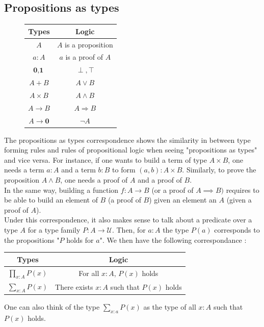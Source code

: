 \documentclass{report}
\begin{document}
\subsection{Propositions as types}
\begin{figure}[h]
\begin{center}
\begin{tabular}{|c|c|}
\hline Types & Logic  \\
\hline$A$ & $A$ is a proposition  \\
\hline$a: A$ & $a$ is a proof of $A$ \\
\hline $\textbf{0},\textbf{1}$ & $\perp, \top$ \\
\hline$A+B$ & $A \vee B$  \\
\hline$A \times B$ & $A \wedge B$  \\
\hline$A \rightarrow B$ & $A \Rightarrow B$ \\
\hline$A \rightarrow \textbf{0}$ & $\lnot A$ \\
\hline
\end{tabular}
\end{center}
\end{figure}
The propositions as types correspondence shows the similarity in between type forming rules and rules of propositional logic when seeing "propositions as types" and vice versa. For instance, if one wants to build a term of type $A \times B$, one needs a term $a : A$ and a term $b : B$ to form $(a,b) : A \times B$. Similarly, to prove the proposition $A \land B$, one needs a proof of $A$ and a proof of $B$. \\
In the same way, building a function $f : A \rightarrow B$ (or a proof of $A \implies B)$ requires to be able to build an element of $B$ (a proof of $B$) given an element an $A$ (given a proof of $A$).\\
Under this correspondence, it also makes sense to talk about a predicate over a type $A$ for a type family $P : A \rightarrow \mathcal{U}$. Then, for $a :A$ the type $P(a)$ corresponds to the propositions "$P$ holds for $a$". We then have the following correspondance : 
\begin{center}
  \begin{tabular}{|c|c|}
  \hline Types & Logic  \\
  \hline$\prod_{x : A} P(x)$ & For all $x :A$, $P(x)$ holds  \\
  \hline$\sum_{x : A} P(x)$ & There exists $x : A$ such that $P(x)$ holds\\
  \hline
  \end{tabular}
\end{center} 
One can also think of the type $\sum_{x: a} P(x)$ as the type of all $x : A$ such that $P(x)$ holds.
\end{document}
